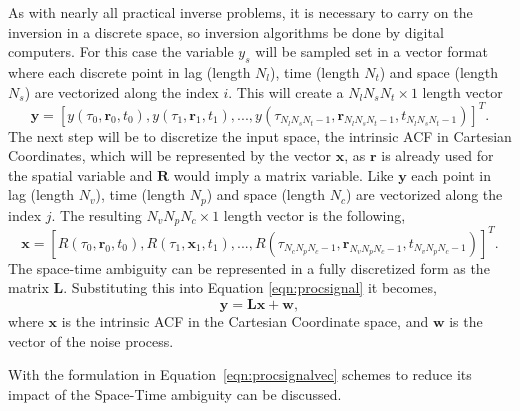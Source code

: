 As with nearly all practical inverse problems, it is necessary to carry on the inversion in a discrete space, so inversion algorithms be done by digital computers. For this case the variable $y_s$ will be sampled set  in a vector format where each discrete point in lag (length $N_l$), time (length $N_t$) and space (length $N_s$) are vectorized along the index $i$. This will create a $N_lN_sN_t\times 1$ length vector 
\begin{equation}
\label{eqn:vec1}
\mathbf{y}=[y(\tau_0,\mathbf{r}_0,t_0), y(\tau_1,\mathbf{r}_1,t_1),..., y(\tau_{N_l N_s N_t -1}, \mathbf{r}_{N_l N_s N_t -1}, t_{N_l N_s N_t -1})]^T.
\end{equation}
The next step will be to discretize the input space, the intrinsic ACF in Cartesian Coordinates, which will be represented by the vector $\mathbf{x}$, as $\mathbf{r}$ is already used for the spatial variable and $\mathbf{R}$ would imply a matrix variable. Like $\mathbf{y}$ each point in lag (length $N_v$), time (length $N_p$) and space (length $N_c$) are vectorized along the index $j$. The resulting $N_vN_pN_c\times 1$ length vector is the following,
\begin{equation}
\label{eqn:vecr}
\mathbf{x}=[R(\tau_0,\mathbf{r}_0,t_0), R(\tau_1,\mathbf{x}_1,t_1),..., R(\tau_{N_c N_p N_c -1}, \mathbf{r}_{N_v N_p N_c -1}, t_{N_v N_p N_c -1})]^T.
\end{equation}
The space-time ambiguity can be represented in a fully discretized form as the matrix $\mathbf{L}$. Substituting this into Equation \ref{eqn:procsignal} it becomes,
\begin{equation}
\label{eqn:procsignalvec}
 \mathbf{y} = \mathbf{L}\mathbf{x}+ \mathbf{w},
\end{equation}
\noindent where $\mathbf{x}$ is the intrinsic ACF in the Cartesian Coordinate space, and $\mathbf{w}$ is the vector of the noise process.

With the formulation in Equation~\ref{eqn:procsignalvec} schemes to reduce its impact of the Space-Time ambiguity can be discussed.

%
%

